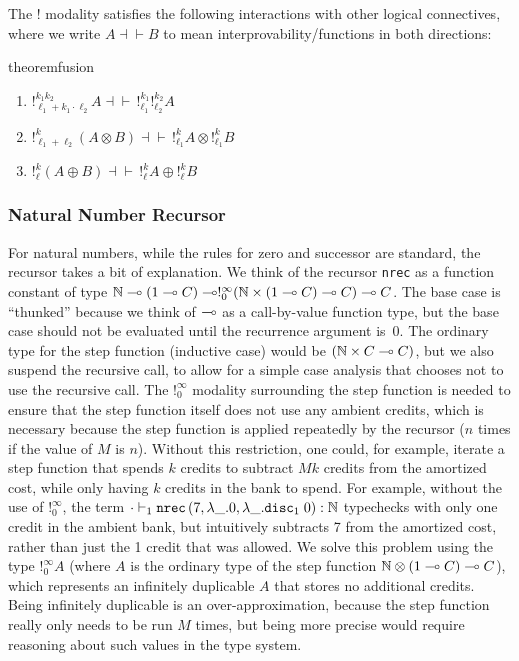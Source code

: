 The $!$ modality satisfies the following interactions with other logical
connectives, where we write $A \dashv \vdash B$ to mean
interprovability/functions in both directions:

\begin{restatable}{theorem}{fusion}\hfill
\label{thm:fusion}
\begin{enumerate}
  \item $!^{k_1k_2}_{\ell_1 + k_1 \cdot \ell_2} A \dashv \vdash \, !^{k_1}_{\ell_1} !^{k_2}_{\ell_2} A$
  \item $!^k_{\ell_1 + \ell_2} (A \otimes B) \dashv \vdash \, !^k_{\ell_1} A \otimes !^k_{\ell_1} B$
  \item $!^k_\ell (A \oplus B) \dashv \vdash \, !^k_\ell A \oplus !^k_\ell B$
\end{enumerate}
\end{restatable}

\subsubsection{Natural Number Recursor} \label{sec:ns-rules}

For natural numbers, while the rules for zero and successor are standard,
the recursor takes a bit of explanation.  We think of
the recursor \texttt{nrec} as a function constant of type
$\mathbb{N} \multimap (1 \multimap C) \multimap !^\infty_0(\mathbb{N} \times (1 \multimap C) \multimap C) 
 \multimap C$.
The base case is ``thunked'' because we think of $\multimap$ as
a call-by-value function type, but the base case should not be evaluated until the recurrence
argument is~$0$.  The ordinary type for the step function (inductive case)
would be $(\mathbb{N} \times C \multimap C)$, but we also suspend the recursive
call, to allow for a simple case analysis that chooses not to use the
recursive call.  
The $!^\infty_0$ modality surrounding the step function is needed to
ensure that the step function itself does not use any ambient credits,
which is necessary because the step function is applied repeatedly by
the recursor ($n$ times if the value of $M$ is $n$).  Without this
restriction, one could, for example, iterate a step function that spends
$k$ credits to subtract $Mk$ credits from the amortized cost, while only
having $k$ credits in the bank to spend.  For example, without the use of $!^\infty_0$, the term
$\cdot\vdash_1\texttt{nrec}\left(7,\lambda\_.0,\lambda\_.\texttt{disc}_{1} \; 0\right) : \mathbb{N}$ typechecks
with only one credit in the ambient bank, but 
intuitively subtracts 7 from the amortized cost, rather than just the
1 credit that was allowed.  
We solve this problem using the type $!^\infty_0 A$ (where $A$ is the ordinary
type of the step function $\mathbb{N} \otimes (1 \multimap C) \multimap C$),
which represents an infinitely duplicable $A$ that stores no additional credits.
Being infinitely duplicable is an over-approximation, because
the step function really only needs to be run $M$ times, but
being more precise would require reasoning about such values in the
type system.

